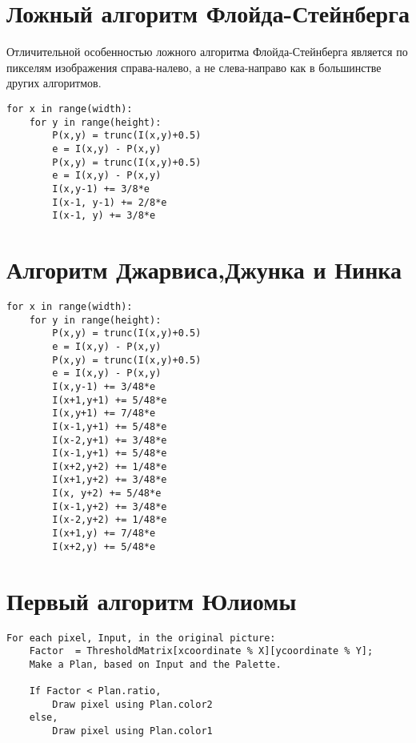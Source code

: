 \section{Ложный алгоритм Флойда-Стейнберга}
Отличительной особенностью ложного алгоритма Флойда-Стейнберга является по пикселям изображения справа-налево, а не слева-направо как в большинстве других алгоритмов.
\begin{lstlisting}[style=pseudocode,caption={Ложный алгоритм Флойда-Стейнберга}]
for x in range(width):
    for y in range(height):
        P(x,y) = trunc(I(x,y)+0.5)
        e = I(x,y) - P(x,y)
        P(x,y) = trunc(I(x,y)+0.5)
        e = I(x,y) - P(x,y)
        I(x,y-1) += 3/8*e
        I(x-1, y-1) += 2/8*e
        I(x-1, y) += 3/8*e
\end{lstlisting}
\section{Алгоритм Джарвиса,Джунка и Нинка}

\begin{lstlisting}[style=pseudocode,caption={Алгоритм Джарвиса,Джунка и Нинка}]
for x in range(width):
    for y in range(height):
        P(x,y) = trunc(I(x,y)+0.5)
        e = I(x,y) - P(x,y)
        P(x,y) = trunc(I(x,y)+0.5)
        e = I(x,y) - P(x,y)
        I(x,y-1) += 3/48*e
        I(x+1,y+1) += 5/48*e
        I(x,y+1) += 7/48*e
        I(x-1,y+1) += 5/48*e
        I(x-2,y+1) += 3/48*e
        I(x-1,y+1) += 5/48*e
        I(x+2,y+2) += 1/48*e
        I(x+1,y+2) += 3/48*e
        I(x, y+2) += 5/48*e
        I(x-1,y+2) += 3/48*e
        I(x-2,y+2) += 1/48*e
        I(x+1,y) += 7/48*e
        I(x+2,y) += 5/48*e

\end{lstlisting}


\bigskip

\section{Первый алгоритм Юлиомы}
\begin{lstlisting}[style=pseudocode,caption={Первый алгоритм Юлиомы}]
For each pixel, Input, in the original picture:
    Factor  = ThresholdMatrix[xcoordinate % X][ycoordinate % Y];
    Make a Plan, based on Input and the Palette.

    If Factor < Plan.ratio,
        Draw pixel using Plan.color2
    else,
        Draw pixel using Plan.color1
\end{lstlisting}


